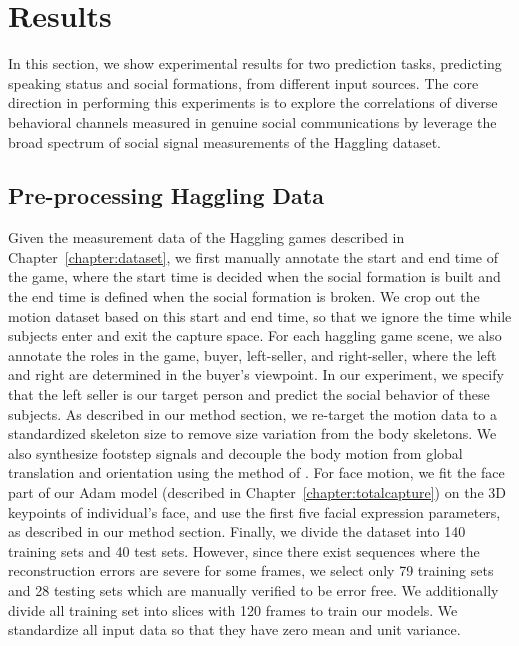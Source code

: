 


\section{Results}
In this section, we show experimental results for two prediction tasks, predicting speaking status and social formations, from different input sources. The core direction in performing this experiments is to explore the correlations of diverse behavioral channels measured in genuine social communications by leverage the broad spectrum of social signal measurements of the Haggling dataset.

\subsection{Pre-processing Haggling Data}
Given the measurement data of the Haggling games described in Chapter~\ref{chapter:dataset}, we first manually annotate the start and end time of the game, where the start time is decided when the social formation is built and the end time is defined when the social formation is broken. We crop out the motion dataset based on this start and end time, so that we ignore the time while subjects enter and exit the capture space. For each haggling game scene, we also annotate the roles in the game, buyer, left-seller, and right-seller, where the left and right are determined in the buyer's viewpoint. In our experiment, we specify that the left seller is our target person and predict the social behavior of these subjects. As described in our method section, we re-target the motion data to a standardized skeleton size to remove size variation from the body skeletons. We also synthesize footstep signals and decouple the body motion from global translation and orientation using the method of \cite{holden2016deep}. For face motion, we fit the face part of our Adam model (described in Chapter~\ref{chapter:totalcapture}) on the 3D keypoints of individual's face, and use the first five facial expression parameters, as described in our method section. Finally, we divide the dataset into 140 training sets and 40 test sets. However, since there exist sequences where the reconstruction errors are severe for some frames, we select only 79 training sets and 28 testing sets which are manually verified to be error free. We additionally divide all training set into slices with 120 frames to train our models. We standardize all input data so that they have zero mean and unit variance.


